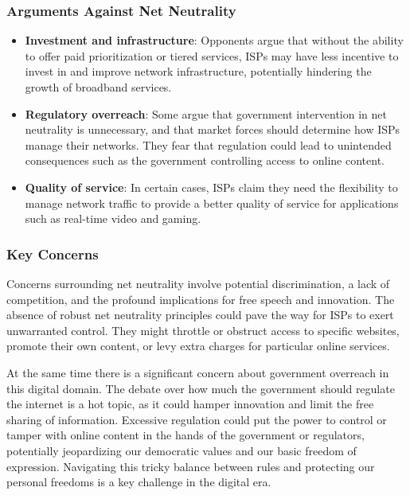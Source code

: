 \documentclass[
  letterpaper,
  DIV=11,
  numbers=noendperiod]{scrreprt}
\providecommand{\tightlist}{%
  \setlength{\itemsep}{0pt}\setlength{\parskip}{0pt}}\usepackage{longtable,booktabs,array}
\begin{document}
\subsubsection*{Arguments Against Net
Neutrality}\label{arguments-against-net-neutrality}

\begin{itemize}
\tightlist
\item
  \textbf{Investment and infrastructure}: Opponents argue that without
  the ability to offer paid prioritization or tiered services, ISPs may
  have less incentive to invest in and improve network infrastructure,
  potentially hindering the growth of broadband services.
\item
  \textbf{Regulatory overreach}: Some argue that government intervention
  in net neutrality is unnecessary, and that market forces should
  determine how ISPs manage their networks. They fear that regulation
  could lead to unintended consequences such as the government
  controlling access to online content.
\item
  \textbf{Quality of service}: In certain cases, ISPs claim they need
  the flexibility to manage network traffic to provide a better quality
  of service for applications such as real-time video and gaming.
\end{itemize}

\subsubsection*{Key Concerns}\label{key-concerns}

Concerns surrounding net neutrality involve potential discrimination, a
lack of competition, and the profound implications for free speech and
innovation. The absence of robust net neutrality principles could pave
the way for ISPs to exert unwarranted control. They might throttle or
obstruct access to specific websites, promote their own content, or levy
extra charges for particular online services.

At the same time there is a significant concern about government
overreach in this digital domain. The debate over how much the
government should regulate the internet is a hot topic, as it could
hamper innovation and limit the free sharing of information. Excessive
regulation could put the power to control or tamper with online content
in the hands of the government or regulators, potentially jeopardizing
our democratic values and our basic freedom of expression. Navigating
this tricky balance between rules and protecting our personal freedoms
is a key challenge in the digital era.
\end{document}
